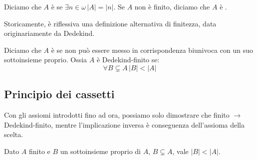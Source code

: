 \documentclass[11pt]{scrartcl}
\begin{document}
\begin{definition}
	Diciamo che $A$ è  se $\exists n \in \omega \, |A| = |n|$. Se $A$ non è finito, diciamo che $A$ è .
\end{definition}

Storicamente, è riflessiva una definizione alternativa di finitezza, data originariamente da Dedekind.

\begin{definition}
	Diciamo che $A$ è  se non può essere messo in corrispondenza biunivoca con un suo sottoinsieme proprio. Ossia $A$ è Dedekind-finito se:
	\[ \forall B \subsetneq A \, |B| < |A|
		\]
\end{definition}

\subsection{Principio dei cassetti}
Con gli assiomi introdotti fino ad ora, possiamo solo dimostrare che finito $\rightarrow$ Dedekind-finito, mentre l'implicazione inversa è conseguenza dell'assioma della scelta.

\begin{proposition}
	\label{cassetti}
	Dato $A$ finito e $B$ un sottoinsieme proprio di $A$, $B \subsetneq A$, vale $|B| < |A|$. 
\end{proposition}
\end{document}
